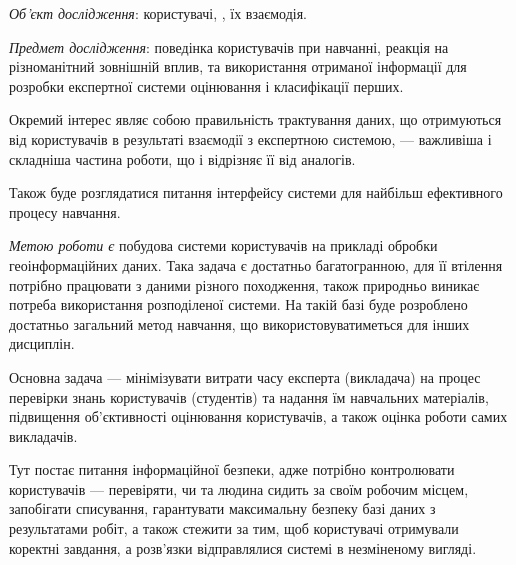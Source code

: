 


\textit{Об’єкт дослідження}:
користувачі, , їх взаємодія.

\textit{Предмет дослідження}:
поведінка користувачів при навчанні, реакція на різноманітний зовнішній вплив,
та використання отриманої інформації для розробки експертної системи оцінювання
і класифікації перших.

Окремий інтерес являє собою правильність трактування даних, що отримуються від
користувачів в результаті взаємодії з експертною системою, --- важливіша і
складніша частина роботи, що і відрізняє її від аналогів.

Також буде розглядатися питання  інтерфейсу
системи для найбільш ефективного процесу навчання.

\textit{Метою роботи є}
побудова системи  користувачів на
прикладі обробки геоінформаційних даних.
Така задача є достатньо багатогранною, для її втілення потрібно працювати
з даними різного походження, також природньо виникає потреба використання
розподіленої системи.
На такій базі буде розроблено достатньо загальний метод навчання,
що використовуватиметься для інших дисциплін.

Основна задача --- мінімізувати витрати часу експерта (викладача) на процес
перевірки знань користувачів (студентів) та надання їм навчальних матеріалів,
підвищення об’єктивності оцінювання користувачів, а також оцінка роботи
самих викладачів.

Тут постає питання інформаційної безпеки, адже потрібно контролювати
користувачів --- перевіряти, чи та людина сидить за своїм робочим місцем,
запобігати списування, гарантувати максимальну безпеку базі даних з
результатами робіт, а також стежити за тим, щоб користувачі отримували коректні
завдання, а розв’язки відправлялися системі в незміненому вигляді.
